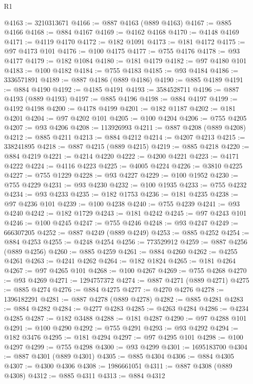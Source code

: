 \begin{lexlean}{R1}
\begin{coremodule}
@4163 := 3210313671
@4166 := @887 @4163 (@889 @4163)
@4167 := @885 @4166
@4168 := @884 @4167
@4169 := @4162 @4168
@4170 := @4148 @4169
@4171 := @4119 @4170
@4172 := @182 @1091
@4173 := @181 @4172
@4175 := @97 @4173 @101
@4176 := @100 @4175
@4177 := @755 @4176
@4178 := @93 @4177
@4179 := @182 @1084
@4180 := @181 @4179
@4182 := @97 @4180 @101
@4183 := @100 @4182
@4184 := @755 @4183
@4185 := @93 @4184
@4186 := 3336571891
@4189 := @887 @4186 (@889 @4186)
@4190 := @885 @4189
@4191 := @884 @4190
@4192 := @4185 @4191
@4193 := 3584528711
@4196 := @887 @4193 (@889 @4193)
@4197 := @885 @4196
@4198 := @884 @4197
@4199 := @4192 @4198
@4200 := @4178 @4199
@4201 := @182 @1187
@4202 := @181 @4201
@4204 := @97 @4202 @101
@4205 := @100 @4204
@4206 := @755 @4205
@4207 := @93 @4206
@4208 := 113926993
@4211 := @887 @4208 (@889 @4208)
@4212 := @885 @4211
@4213 := @884 @4212
@4214 := @4207 @4213
@4215 := 338241895
@4218 := @887 @4215 (@889 @4215)
@4219 := @885 @4218
@4220 := @884 @4219
@4221 := @4214 @4220
@4222 := @4200 @4221
@4223 := @4171 @4222
@4224 := @4116 @4223
@4225 := @4005 @4224
@4226 := @3810 @4225
@4227 := @755 @1229
@4228 := @93 @4227
@4229 := @100 @1952
@4230 := @755 @4229
@4231 := @93 @4230
@4232 := @100 @1935
@4233 := @755 @4232
@4234 := @93 @4233
@4235 := @182 @1753
@4236 := @181 @4235
@4238 := @97 @4236 @101
@4239 := @100 @4238
@4240 := @755 @4239
@4241 := @93 @4240
@4242 := @182 @1729
@4243 := @181 @4242
@4245 := @97 @4243 @101
@4246 := @100 @4245
@4247 := @755 @4246
@4248 := @93 @4247
@4249 := 666307205
@4252 := @887 @4249 (@889 @4249)
@4253 := @885 @4252
@4254 := @884 @4253
@4255 := @4248 @4254
@4256 := 773529912
@4259 := @887 @4256 (@889 @4256)
@4260 := @885 @4259
@4261 := @884 @4260
@4262 := @4255 @4261
@4263 := @4241 @4262
@4264 := @182 @1824
@4265 := @181 @4264
@4267 := @97 @4265 @101
@4268 := @100 @4267
@4269 := @755 @4268
@4270 := @93 @4269
@4271 := 1294757372
@4274 := @887 @4271 (@889 @4271)
@4275 := @885 @4274
@4276 := @884 @4275
@4277 := @4270 @4276
@4278 := 1396182291
@4281 := @887 @4278 (@889 @4278)
@4282 := @885 @4281
@4283 := @884 @4282
@4284 := @4277 @4283
@4285 := @4263 @4284
@4286 := @4234 @4285
@4287 := @182 @3488
@4288 := @181 @4287
@4290 := @97 @4288 @101
@4291 := @100 @4290
@4292 := @755 @4291
@4293 := @93 @4292
@4294 := @182 @3476
@4295 := @181 @4294
@4297 := @97 @4295 @101
@4298 := @100 @4297
@4299 := @755 @4298
@4300 := @93 @4299
@4301 := 1695183700
@4304 := @887 @4301 (@889 @4301)
@4305 := @885 @4304
@4306 := @884 @4305
@4307 := @4300 @4306
@4308 := 1986661051
@4311 := @887 @4308 (@889 @4308)
@4312 := @885 @4311
@4313 := @884 @4312

\end{coremodule}
\end{lexlean}
